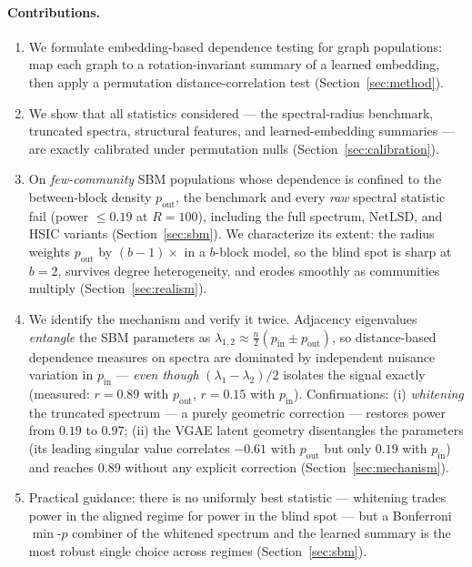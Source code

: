 \documentclass[11pt]{article}
\begin{document}
\paragraph{Contributions.}
\begin{enumerate}
  \item We formulate embedding-based dependence testing for graph populations:
        map each graph to a rotation-invariant summary of a learned embedding,
        then apply a permutation distance-correlation test
        (Section~\ref{sec:method}).
  \item We show that all statistics considered --- the spectral-radius benchmark,
        truncated spectra, structural features, and learned-embedding summaries
        --- are exactly calibrated under permutation nulls
        (Section~\ref{sec:calibration}).
  \item On \emph{few-community} SBM populations whose dependence is confined to
        the between-block density $p_{\mathrm{out}}$, the benchmark and every
        \emph{raw} spectral statistic fail (power $\le 0.19$ at $R = 100$),
        including the full spectrum, NetLSD, and HSIC variants
        (Section~\ref{sec:sbm}). We characterize its extent: the radius weights
        $p_{\mathrm{out}}$ by $(b{-}1)\times$ in a $b$-block model, so the blind
        spot is sharp at $b = 2$, survives degree heterogeneity, and erodes
        smoothly as communities multiply (Section~\ref{sec:realism}).
  \item We identify the mechanism and verify it twice. Adjacency eigenvalues
        \emph{entangle} the SBM parameters as $\lambda_{1,2} \approx
        \tfrac{n}{2}(p_{\mathrm{in}} \pm p_{\mathrm{out}})$, so distance-based
        dependence measures on spectra are dominated by independent nuisance
        variation in $p_{\mathrm{in}}$ --- \emph{even though}
        $(\lambda_1 - \lambda_2)/2$ isolates the signal exactly (measured:
        $r = 0.89$ with $p_{\mathrm{out}}$, $r = 0.15$ with $p_{\mathrm{in}}$).
        Confirmations: (i) \emph{whitening} the truncated spectrum --- a purely
        geometric correction --- restores power from $0.19$ to $0.97$; (ii) the
        VGAE latent geometry disentangles the parameters (its leading singular
        value correlates $-0.61$ with $p_{\mathrm{out}}$ but only $0.19$ with
        $p_{\mathrm{in}}$) and reaches $0.89$ without any explicit correction
        (Section~\ref{sec:mechanism}).
  \item Practical guidance: there is no uniformly best statistic --- whitening
        trades power in the aligned regime for power in the blind spot --- but a
        Bonferroni $\min$-$p$ combiner of the whitened spectrum and the learned
        summary is the most robust single choice across regimes
        (Section~\ref{sec:sbm}).
\end{enumerate}
\end{document}
